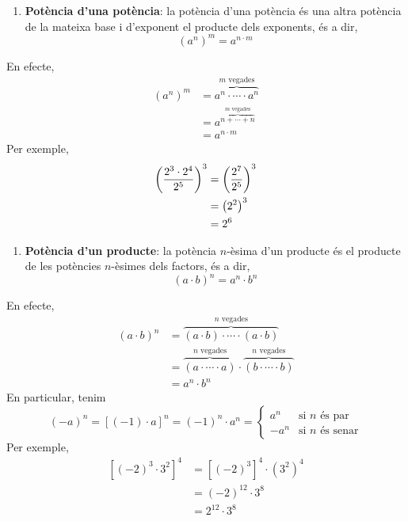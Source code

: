 \begin{enumerate}
\item[3.] \textbf{Potència d’una potència}: la potència d’una potència és
una altra potència de la mateixa base i d’exponent el producte dels exponents,
és a dir,%
\begin{equation*}
\left( a^{n}\right) ^{m}=a^{n\cdot m}
\end{equation*}
\end{enumerate}

En efecte,%
\begin{align*}
\left( a^{n}\right) ^{m} &=\overset{m\text{ vegades}}{\overbrace{a^{n}\cdot
\cdots \cdot a^{n}}} \\
&=a^{\overset{m\text{ vegades}}{\overbrace{n+\cdots +n}}} \\
&=a^{n\cdot m}
\end{align*}%
Per exemple,%
\begin{align*}
\left( \frac{2^{3}\cdot 2^{4}}{2^{5}}\right) ^{3} &=\left( \frac{2^{7}}{%
2^{5}}\right) ^{3} \\
&=\left( 2^{2}\right) ^{3} \\
&=2^{6}
\end{align*}

\begin{enumerate}
\item[4.] \textbf{Potència d’un producte}: la potència $n$-èsima d’un
producte és el producte de les potències $n$-èsimes dels factors, és a
dir,%
\begin{equation*}
\left( a\cdot b\right) ^{n}=a^{n}\cdot b^{n}
\end{equation*}
\end{enumerate}

En efecte,%
\begin{align*}
\left( a\cdot b\right) ^{n} &=\overset{n\text{ vegades}}{\overbrace{\left(
a\cdot b\right) \cdot \cdots \cdot \left( a\cdot b\right) }} \\
&=\overset{n\text{ vegades}}{\overbrace{\left( a\cdot \cdots \cdot a\right) }}%
\cdot \overset{n\text{ vegades}}{\overbrace{\left( b\cdot \cdots \cdot
b\right) }} \\
&=a^{n}\cdot b^{n}
\end{align*}%
En particular, tenim%
\begin{equation*}
(-a)^{n}=\left[ (-1)\cdot a\right] ^{n}=(-1)^{n}\cdot a^{n}=\left\{ 
\begin{array}{ll}
a^{n} & \text{si }n\text{ és par} \\ 
-a^{n} & \text{si }n\text{ és senar}%
\end{array}%
\right.
\end{equation*}%
Per exemple,%
\begin{align*}
\left[ (-2)^{3}\cdot 3^{2}\right] ^{4} &=\left[ (-2)^{3}\right] ^{4}\cdot
\left( 3^{2}\right) ^{4} \\
&=\left( -2\right) ^{12}\cdot 3^{8} \\
&=2^{12}\cdot 3^{8}
\end{align*}


